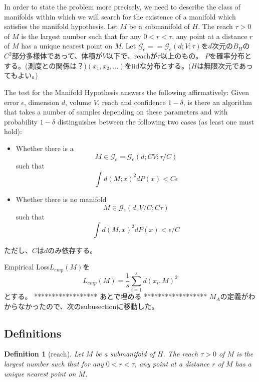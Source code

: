 \documentclass{ujarticle}
\newtheorem{dfn}[thm]{Definition}
\begin{document}
In order to state the problem more precisely, we need to describe the class of manifolds within which we
will search for the existence of a manifold which satisfies the manifold hypothesis.
Let $M$ be a submanifold of $H$. The reach $ \tau > 0$ of $M$ is the largest number such that
for any $0 < r < \tau$, any point at a distance $r$ of $M$ has a unique nearest point on $M$.
Let $\mathcal{G}_e == \mathcal{G}_e(d; V;\tau)$を$d$次元の$B_H$の$C^2$部分多様体であって、体積が$V$以下で、reachが$\tau$以上のもの。
$P$を確率分布とする。(測度との関係は？)$(x_1,x_2,\dots)$をiidな分布とする。($H$は無限次元であってもよい。)

The test for the Manifold Hypothesis answers the following affirmatively: Given error $\epsilon$, dimension $d$,
volume $V$, reach and confidence $1 - \delta$, is there an algorithm that takes a number of samples depending on
these parameters and with probability $1 - \delta$ distinguishes between the following two cases (as least one must
hold):
\begin{itemize}
  \item Whether there is a
  \begin{equation*}
    M \in \mathcal{G}_e = \mathcal{G}_e(d;CV;\tau/C)
  \end{equation*}
  such that
  \begin{equation*}
    \int d(M; x)^2 dP(x) < C \epsilon
  \end{equation*}
  \item Whether there is no manifold
  \begin{equation*}
    M \in \mathcal{G}_e(d, V/C; C\tau)
  \end{equation*}
  such that
  \begin{equation*}
    \int d(M,x)^2dP(x) < \epsilon/C
  \end{equation*}
\end{itemize}
ただし、$C$は$d$のみ依存する。

Empirical Loss$L_{emp}(M)$を
\begin{equation*}
 L_{emp}(M)= \frac{1}{s}\sum_{i=1}^s d(x_i,M)^2
\end{equation*}
とする。
******************
 あとで埋める
******************
$M_A$の定義がわからなかったので、次のsubusectionに移動した。

\subsection{Definitions}
\label{sub-Definitions}
\begin{dfn}[reach]
  Let $M$ be a submanifold of $H$. The reach $ \tau > 0$ of $M$ is the largest number such that
  for any $0 < r < \tau$, any point at a distance $r$ of $M$ has a unique nearest point on $M$.
\end{dfn}
\end{document}
